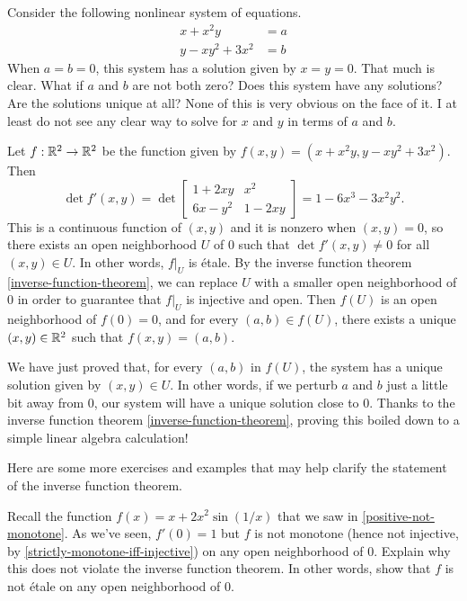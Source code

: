 \begin{example}
	Consider the following nonlinear system of equations. 
	\[ \begin{aligned} x + x^2y &= a \\ y - xy^2 + 3x^2 &= b \end{aligned} \]
	When $a = b = 0$, this system has a solution given by $x = y = 0$. That much is clear. What if $a$ and $b$ are not both zero? Does this system have any solutions? Are the solutions unique at all? None of this is very obvious on the face of it. I at least do not see any clear way to solve for $x$ and $y$ in terms of $a$ and $b$.  
	
	Let $f : \mathbb{R}^2 \to \mathbb{R}^2$ be the function given by $f(x,y) = (x+x^2y, y - xy^2 + 3x^2)$. Then 
	\[ \det f'(x,y) = \det \begin{bmatrix} 1 + 2xy & x^2 \\ 6x -y^2 & 1 - 2xy \end{bmatrix} = 1 - 6x^3 - 3x^2y^2. \]
	This is a continuous function of $(x,y)$ and it is nonzero when $(x,y) = 0$, so there exists an open neighborhood $U$ of $0$ such that $\det f'(x,y) \neq 0$ for all $(x,y) \in U$. In other words, $f|_U$ is \'etale. By the inverse function theorem \ref{inverse-function-theorem}, we can replace $U$ with a smaller open neighborhood of 0 in order to guarantee that $f|_U$ is injective and open. Then $f(U)$ is an open neighborhood of $f(0) = 0$, and for every $(a,b) \in f(U)$, there exists a unique $(x,y) \in \mathbb{R}^2$ such that $f(x,y) = (a,b)$. 
	
	We have just proved that, for every $(a,b)$ in $f(U)$, the system has a unique solution given by $(x,y) \in U$. In other words, if we perturb $a$ and $b$ just a little bit away from 0, our system will have a unique solution close to 0. Thanks to the inverse function theorem \ref{inverse-function-theorem}, proving this boiled down to a simple linear algebra calculation!
\end{example}

Here are some more exercises and examples that may help clarify the statement of the inverse function theorem. 

\begin{exercise}
	Recall the function $f(x) = x + 2x^2 \sin(1/x)$ that we saw in \cref{positive-not-monotone}. As we've seen, $f'(0) = 1$ but $f$ is not monotone (hence not injective, by \cref{strictly-monotone-iff-injective}) on any open neighborhood of $0$. Explain why this does not violate the inverse function theorem. In other words, show that $f$ is not \'etale on any open neighborhood of 0.
\end{exercise}


